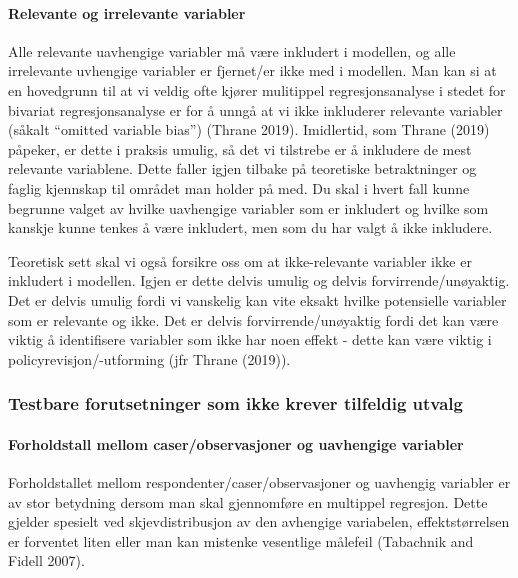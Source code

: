 \documentclass[
]{article}
\begin{document}
\hypertarget{relevante-og-irrelevante-variabler}{%
\paragraph{Relevante og irrelevante
variabler}\label{relevante-og-irrelevante-variabler}}

Alle relevante uavhengige variabler må være inkludert i modellen, og
alle irrelevante uvhengige variabler er fjernet/er ikke med i modellen.
Man kan si at en hovedgrunn til at vi veldig ofte kjører mulitippel
regresjonsanalyse i stedet for bivariat regresjonsanalyse er for å unngå
at vi ikke inkluderer relevante variabler (såkalt ``omitted variable
bias'') (Thrane 2019). Imidlertid, som Thrane (2019) påpeker, er dette i
praksis umulig, så det vi tilstrebe er å inkludere de mest relevante
variablene. Dette faller igjen tilbake på teoretiske betraktninger og
faglig kjennskap til området man holder på med. Du skal i hvert fall
kunne begrunne valget av hvilke uavhengige variabler som er inkludert og
hvilke som kanskje kunne tenkes å være inkludert, men som du har valgt å
ikke inkludere.

Teoretisk sett skal vi også forsikre oss om at ikke-relevante variabler
ikke er inkludert i modellen. Igjen er dette delvis umulig og delvis
forvirrende/unøyaktig. Det er delvis umulig fordi vi vanskelig kan vite
eksakt hvilke potensielle variabler som er relevante og ikke. Det er
delvis forvirrende/unøyaktig fordi det kan være viktig å identifisere
variabler som ikke har noen effekt - dette kan være viktig i
policyrevisjon/-utforming (jfr Thrane (2019)).

\hypertarget{testbare-forutsetninger-som-ikke-krever-tilfeldig-utvalg}{%
\subsubsection{Testbare forutsetninger som ikke krever tilfeldig
utvalg}\label{testbare-forutsetninger-som-ikke-krever-tilfeldig-utvalg}}

\hypertarget{forholdstall-mellom-caserobservasjoner-og-uavhengige-variabler}{%
\paragraph{Forholdstall mellom caser/observasjoner og uavhengige
variabler}\label{forholdstall-mellom-caserobservasjoner-og-uavhengige-variabler}}

Forholdstallet mellom respondenter/caser/observasjoner og uavhengig
variabler er av stor betydning dersom man skal gjennomføre en multippel
regresjon. Dette gjelder spesielt ved skjevdistribusjon av den avhengige
variabelen, effektstørrelsen er forventet liten eller man kan mistenke
vesentlige målefeil (Tabachnik and Fidell 2007).
\end{document}
